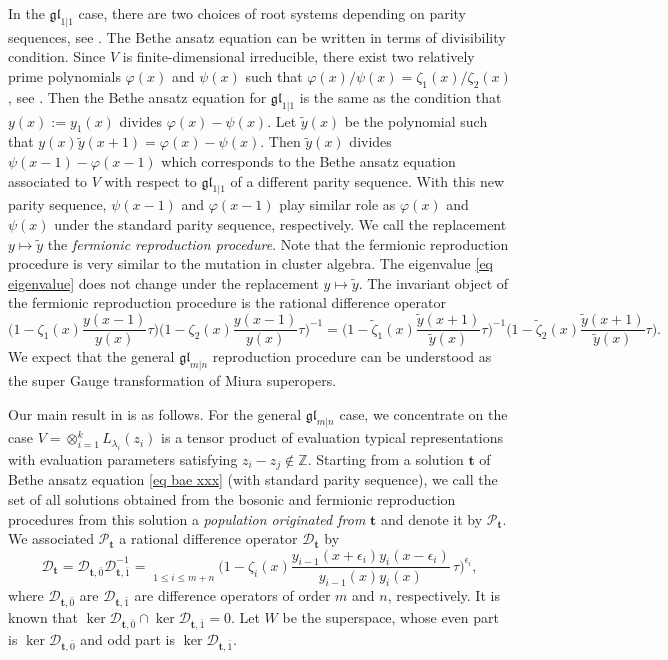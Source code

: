 \documentclass[11pt,reqno]{amsart}
\numberwithin{equation}{section}
\theoremstyle{definition}
\theoremstyle{remark}
\newcommand{\beq}{\begin{equation}}
\newcommand{\eeq}{\end{equation}}
\newcommand{\Z}{\mathbb{Z}}
\newcommand{\mc}{\mathcal}
\newcommand{\gl}{\mathfrak{gl}}
\newcommand{\tl}{\tilde}
\newcommand{\lle}{\leqslant}
\newcommand{\la}{\lambda}
\begin{document}
In the $\gl_{1|1}$ case, there are two choices of root systems depending on parity sequences, see \cite{CW:2012}. The Bethe ansatz equation can be written in terms of divisibility condition. Since $V$ is finite-dimensional irreducible, there exist two relatively prime polynomials $\varphi(x)$ and $\psi(x)$ such that $\varphi(x)/\psi(x)=\zeta_1(x)/\zeta_2(x)$, see \cite{Zh:1995}. Then the Bethe ansatz equation for $\gl_{1|1}$ is the same as the condition that $y(x):=y_1(x)$ divides $\varphi(x)-\psi(x)$. Let $\tl y(x)$ be the polynomial such that $y(x)\tl y(x+1)=\varphi(x)-\psi(x)$. Then $\tl y(x)$ divides $\psi(x-1)-\varphi(x-1)$ which  corresponds to the Bethe ansatz equation associated to $V$ with respect to $\gl_{1|1}$ of a different parity sequence. With this new parity sequence, $\psi(x-1)$ and $\varphi(x-1)$ play similar role as $\varphi(x)$ and $\psi(x)$ under the standard parity sequence, respectively. We call the replacement $y\mapsto \tl y$ the \textit{fermionic reproduction procedure}. Note that the fermionic reproduction procedure is very similar to the mutation in cluster algebra. The eigenvalue \eqref{eq eigenvalue} does not change under the replacement $y\mapsto \tl y$. The invariant object of the fermionic reproduction procedure is the rational difference operator 
\beq\label{eq:odd}
\Big(1-\zeta_1(x)\frac{y(x-1)}{y(x)}\tau\Big)\Big(1-\zeta_2(x)\frac{y(x-1)}{y(x)}\tau\Big)^{-1}=\Big(1-\tl\zeta_1(x)\frac{\tl y(x+1)}{\tl y(x)}\tau\Big)^{-1}\Big(1-\tl\zeta_2(x)\frac{\tl y(x+1)}{\tl y(x)}\tau\Big).
\eeq
We expect that the general $\gl_{m|n}$ reproduction procedure can be understood as the super Gauge transformation of Miura superopers.

Our main result in \cite{HLM:2019} is as follows. For the general $\gl_{m|n}$ case, we concentrate on the case $V=\otimes_{i=1}^k L_{\la_i}(z_i)$ is a tensor product of evaluation typical representations with evaluation parameters satisfying $z_i-z_j\not\in\Z$. Starting from a solution $\bm t$ of Bethe ansatz equation \eqref{eq bae xxx} (with standard parity sequence), we call the set of all solutions obtained from the bosonic and fermionic reproduction procedures from this solution a \emph{population originated from} $\bm t$ and denote it by $\mc P_{\bm t}$. We associated $\mc P_{\bm t}$ a rational difference operator $\mc D_{\bm t}$ by
\beq\label{eq rational diff oper}
\mc D_{\bm t}=\mc D_{\bm t,\bar 0}\mc D^{-1}_{\bm t,\bar 1}=\mathop{\overrightarrow\prod}\limits_{1\lle i\lle m+n}\Big(1-\zeta_i(x)\frac{y_{i-1}(x+\epsilon_i)y_i(x-\epsilon_i)}{y_{i-1}(x)y_i(x)}\, \tau\Big)^{\epsilon_i},
\eeq
where $\mc D_{\bm t,\bar 0}$ are $\mc D_{\bm t,\bar 1}$ are difference operators of order $m$ and $n$, respectively. It is known that $\ker \mc D_{\bm t,\bar 0}\cap \ker \mc D_{\bm t,\bar 1}=0$. Let $W$ be the superspace, whose even part is $\ker \mc D_{\bm t,\bar 0}$ and odd part is $\ker \mc D_{\bm t,\bar 1}$.
\end{document}
